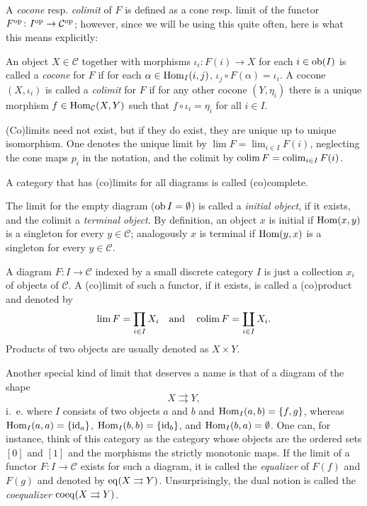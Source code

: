 \documentclass[a4paper,openany]{scrbook}
\renewcommand{\C}{\mathcal C}
\begin{document}
A \emph{cocone} resp. \emph{colimit} of $F$ is defined as a cone resp. limit of the functor $F^\op\colon I^\op \to \C^\op$; however, since we will be using this quite often, here is what this means explicitly:

\begin{defn} An object $X \in \C$ together with morphisms $\iota_i\colon F(i) \to X$ for each $i \in \operatorname{ob}(I)$ is called a \emph{cocone} for $F$ if for each $\alpha \in \operatorname{Hom}_I(i,j)$, $\iota_j \circ F(\alpha) = \iota_i$. A cocone $(X,\iota_i)$ is called a \emph{colimit} for $F$ if for any other cocone $(Y,\eta_i)$ there is a unique morphism $f \in \Hom_\C(X,Y)$ such that $f \circ \iota_i = \eta_i$ for all $i \in I$.
\end{defn}

(Co)limits need not exist, but if they do exist, they are unique up to unique isomorphism. One denotes the unique limit by $\lim F = \lim_{i \in I} F(i)$, neglecting the cone maps $p_i$ in the notation, and the colimit by $\operatorname*{colim} F = \operatorname*{colim}_{i \in I} F(i)$.

A category that has (co)limits for all diagrams is called (co)complete.

The limit for the empty diagram ($\operatorname{ob} I = \emptyset$) is called a \emph{initial object}, if it exists, and the colimit a \emph{terminal object}. By definition, an object $x$ is initial if $\operatorname{Hom}(x,y)$ is a singleton for every $y \in \C$; analogously $x$ is terminal if $\operatorname{Hom}(y,x)$ is a singleton for every $y \in \C$.

A diagram $F\colon I \to \C$ indexed by a small discrete category $I$ is just a collection $x_i$ of objects of $\C$. A (co)limit of such a functor, if it exists, is called a (co)product and denoted by
\[
\lim F = \prod_{i \in I} X_i \quad\text{and}\quad \operatorname*{colim} F = \coprod_{i \in I} X_i.
\]
Products of two objects are usually denoted as $X \times Y$.

Another special kind of limit that deserves a name is that of a diagram of the shape
\[
X \rightrightarrows Y,
\]
i.~e. where $I$ consists of two objects $a$ and $b$ and $\operatorname{Hom}_I(a,b) = \{f,g\}$, whereas $\operatorname{Hom}_I(a,a) = \{\operatorname{id}_a\}$, $\operatorname{Hom}_I(b,b) = \{\operatorname{id}_b\}$, and $\operatorname{Hom}_I(b,a) = \emptyset$. One can, for instance, think of this category as the category whose objects are the ordered sets $[0]$ and $[1]$ and the morphisms the strictly monotonic maps. If the limit of a functor $F\colon I \to \C$ exists for such a diagram, it is called the \emph{equalizer} of $F(f)$ and $F(g)$ and denoted by $\operatorname{eq}(X \rightrightarrows Y)$. Unsurprisingly, the dual notion is called the \emph{coequalizer} $\operatorname{coeq}(X \rightrightarrows Y)$.
\end{document}
